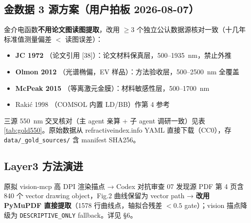 \subsection{金数据 3 源方案（用户拍板 2026-08-07）}

金介电函数\textbf{不用论文图读图提取}，改用 $\geq3$ 个独立公认数据源核对一致（十几年标准值测量偏差 $<$ 读图误差）：

\begin{itemize}
  \item \textbf{JC 1972} \cite{JohnsonChristy1972}（论文引用 [38]）：论文材料保真层，500--1935~nm，禁止外推
  \item \textbf{Olmon 2012} \cite{Olmon2012}（光谱椭偏，EV 样品）：方法验收层，500--2500~nm 全覆盖
  \item \textbf{McPeak 2015} \cite{McPeak2015}（等离激元金膜）：材料敏感性层，500--1700~nm
  \item Raki\'c 1998 \cite{Rakic1998}（COMSOL 内置 LD/BB）作第 4 参考
\end{itemize}

三源 550~nm 交叉核对（主 agent 亲算 + 子 agent 调研一致）见表 \ref{tab:gold550}。原始数据从 refractiveindex.info YAML 直接下载（CC0），存 \texttt{data/\_gold\_sources/} 含 manifest SHA256。

\subsection{Layer3 方法演进}

原拟 vision-mcp 高 DPI 渲染描点 → Codex 对抗审查 07 发现源 PDF 第 4 页含 840 个 vector drawing object，Fig.2 曲线保留为 vector path → \textbf{改用 PyMuPDF 直接提取}（1578 行曲线点，轴拟合残差 $<0.5$ gate）；vision 描点降级为 \texttt{DESCRIPTIVE\_ONLY} fallback。详见 §6。
